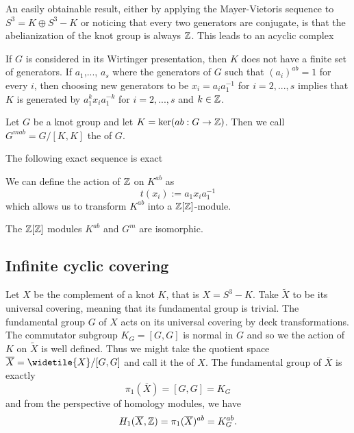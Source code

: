 An easily obtainable result, either by applying the Mayer-Vietoris sequence to $S^3=K\oplus S^3-K$ or noticing that every two generators are conjugate, is that the abelianization of the knot group is always $\operatorname{\mathbb{Z}}$. This leads to an acyclic complex
\begin{center}
\end{center}

If $G$ is considered in its Wirtinger presentation, then $K$ does not have a finite set of generators. If $a_1$,..., $a_s$ where the generators of $G$ such that $(a_i)^{ab}=1$ for every $i$, then choosing new generators to be $x_i=a_ia_1^{-1}$ for $i=2,..., s$ implies that $K$ is generated by $a_1^{k}x_ia_1^{-k}$ for $i=2,...,s$ and $k\in\operatorname{\mathbb{Z}}$.

\begin{definition}[metabelianization]
  Let $G$ be a knot group and let $K=\ker(ab:G\to \operatorname{\mathbb{Z}})$. Then we call $G^{mab}=G/[K, K]$ the  of $G$. 
\end{definition}

{\color{blue}
The following exact sequence is exact
\begin{center}
\end{center}
We can define the action of $\operatorname{\mathbb{Z}}$ on $K^{ab}$ as 
$$t(x_i):=a_1x_ia_1^{-1}$$
which allows us to transform $K^{ab}$ into a $\operatorname{\mathbb{Z}}[\operatorname{\mathbb{Z}}]$-module.
}

\begin{lemma}
  The $\operatorname{\mathbb{Z}}[\operatorname{\mathbb{Z}}]$ modules $K^{ab}$ and $G^m$ are isomorphic.
\end{lemma}

\subsection{Infinite cyclic covering}

Let $X$ be the complement of a knot $K$, that is $X=S^3-K$. Take $\widetilde{X}$ to be its universal covering, meaning that its fundamental group is trivial. The fundamental group $G$ of $X$ acts on its universal covering by deck transformations. The commutator subgroup $K_G=[G, G]$ is normal in $G$ and so we the action of $K$ on $\widetilde{X}$ is well defined. Thus we might take the quotient space $\overline{X}=\widetile{X}/[G, G]$ and call it the  of $X$. The fundamental group of $\overline{X}$ is exactly 
$$\pi_1(\overline{X})=[G, G]=K_G$$
and from the perspective of homology modules, we have
$$H_1(\overline{X}, \operatorname{\mathbb{Z}})=\pi_1(\overline{X})^{ab}=K_G^{ab}.$$

